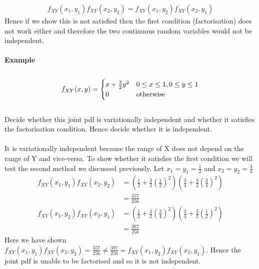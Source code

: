 \documentclass[,oneside]{article}
\begin{document}
\begin{enumerate}
\begin{align*}
f_{XY}(x_1, y_1)f_{XY}(x_2,y_2)=f_{XY}(x_1,y_2)f_{XY}(x_2,y_1)
\end{align*}
Hence if we show this is not satisfied then the first condition (factorisation) does not work either and therefore the two continuous random variables would not be independent.\\ \\
\textbf{Example}\\ \\
\[
f_{XY}(x,y)=
\begin{cases}
x+\frac{3}{2}y^2 &  0 \leq x \leq 1, 0 \leq y \leq 1\\
0 & $otherwise$
\end{cases} \] \\
Decide whether this joint pdf is variationally independent and whether it satisfies the factorisation condition. Hence decide whether it is independent.\\ \\
It is variationally independent because the range of X does not depend on the range of Y and vice-versa. To show whether it satisfies the first condition we will test the second method we discussed previously. Let $x_1 = y_1 = \frac{1}{2}$ and $x_2 = y_2 = \frac{3}{4}$
\begin{align*}
f_{XY}(x_1, y_1)f_{XY}(x_2,y_2)&=\left ( \frac{1}{2}+\frac{3}{2}\left (\frac{1}{2}\right )^2 \right )\left ( \frac{3}{4}+\frac{3}{2}\left (\frac{3}{4}\right )^2 \right )\\
&=\frac{357}{256}
\end{align*}
\begin{align*}
f_{XY}(x_1,y_2)f_{XY}(x_2,y_1)&=\left ( \frac{1}{2}+\frac{3}{2}\left (\frac{3}{4}\right )^2 \right )\left ( \frac{3}{4}+\frac{3}{2}\left (\frac{1}{2}\right )^2 \right )\\
&=\frac{387}{256}
\end{align*}
Here we have shown $f_{XY}(x_1, y_1)f_{XY}(x_2,y_2)=\frac{357}{256}\neq \frac{387}{256}=f_{XY}(x_1,y_2)f_{XY}(x_2,y_1)$. Hence the joint pdf is unable to be factorised and so it is not independent.

\end{enumerate}
\end{document}
